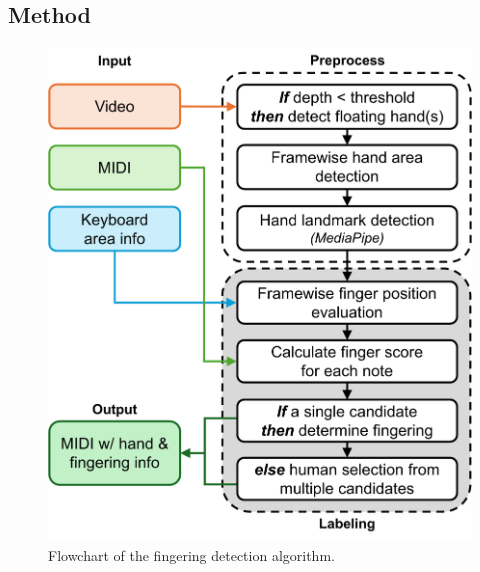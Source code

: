 \documentclass{article}
\begin{document}
\subsection{Method}
% 
\begin{figure}
    \centering
    \includegraphics[width=0.9\linewidth]{Images/fingering_detection3.pdf}\hspace*{0cm}
    \caption{Flowchart of the fingering detection algorithm.}
    \label{fig:fingering_diagram}
\end{figure}
\end{document}
